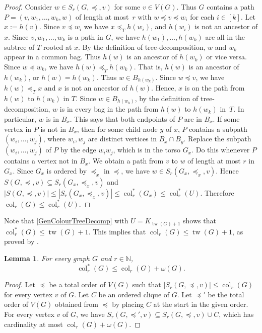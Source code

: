 \documentclass[a4paper,11pt]{article}
\theoremstyle{plain}
\newtheorem{lem}[thm]{Lemma}
\theoremstyle{definition}
\renewcommand{\leq}{\leqslant}
\DeclareMathOperator{\tw}{tw}
\DeclareMathOperator{\col}{col}
\newcommand{\sreach}{S}
\newcommand{\NN}{\mathbb{N}}
\begin{document}
\begin{proof}
Consider $w\in\sreach_r(G,\preceq,v)$ for some $v\in V(G)$. Thus $G$ contains a path $P=(v,w_1,\dots,w_k,w)$ of length at most~$r$ with $w\preceq v\preceq w_i$ for each $i\in[k]$. Let $x:=h(v)$. Since $v\preceq w_i$ we have $x \preceq_T h(w_i)$, and $h(w_i)$ is not an ancestor of $x$. Since $v,w_1,\dots,w_k$ is a path in $G$, we have $h(w_1),\dots,h(w_k)$ are all in the subtree of $T$ rooted at $x$. 
By the definition of tree-decomposition, $w$ and $w_k$ appear in a common bag. Thus $h(w)$ is an ancestor of $h(w_k)$ or vice versa. Since $w\preceq w_k$, we have $h(w) \preceq_T h(w_k)$. That is, $h(w)$ is an ancestor of $h(w_k)$, or $h(w)=h(w_k)$. Thus $w\in B_{h(w_k)}$. Since $w\preceq v$, we have $h(w) \preceq_T x$ and $x$ is not an ancestor of $h(w)$. Hence, $x$ is on the path from $h(w)$ to $h(w_k)$ in $T$. Since $w\in B_{h(w_k)}$, by the definition of tree-decomposition,  $w$ is in every bag in the path from $h(w)$ to $h(w_k)$ in~$T$. In particular, $w$ is in $B_x$. 
This says that both endpoints of $P$ are in $B_x$. If some vertex in $P$ is not in $B_x$, then for some child node $y$ of $x$, $P$ contains a subpath $(w_i,\dots,w_j)$, where $w_i,w_j$ are distinct vertices in $B_x\cap B_y$. Replace the subpath $(w_i,\dots,w_j)$ of $P$ by the edge $w_iw_j$, which is in the torso $G_x$. Do this whenever $P$ contains a vertex not in $B_x$. We obtain a path from $v$ to $w$ of length at most $r$ in $G_x$. Since $G_x$ is ordered by $\preceq_x$ in $\preceq$, we have $w\in \sreach_r(G_x,\preceq_x,v)$. Hence
$\sreach(G,\preceq,v) \subseteq  \sreach_r(G_x,\preceq_x,v)$ and
$|\sreach(G,\preceq,v)| \leq |\sreach_r(G_x,\preceq_x,v)| \leq \col^*_r(G_x) \leq \col^*_r(U)$. Therefore $\col_r(G)\leq \col^*_r(U)$.
\end{proof}

Note that \cref{GenColourTreeDecomp} with $U=K_{\tw(G)+1}$ shows 
that $\col^*_r(G) \leq \tw(G)+1$. This implies that $\col_r(G)\leq \tw(G)+1$, as proved by \citet{GKRSS18}. 

\begin{lem}
\label{MakeRootedColNum}
For every graph $G$ and $r\in\NN$, 
$$\col^*_r(G) \leq \col_r(G)+ \omega(G).$$ 
\end{lem}
 
\begin{proof}
Let $\preceq$ be a total order of $V(G)$ such that $|\sreach_r(G,\preceq,v)| \leq \col_r(G)$ for every vertex $v$ of $G$. Let $C$ be an ordered clique of $G$. Let $\preceq'$ be the total order of $V(G)$ obtained from $\preceq$ by placing $C$ at the start in the given order. For every vertex $v$ of $G$, we have $\sreach_r(G,\preceq',v) \subseteq \sreach_r(G,\preceq,v) \cup C$, which has cardinality at most $\col_r(G)+\omega(G)$.
\end{proof}
\end{document}
